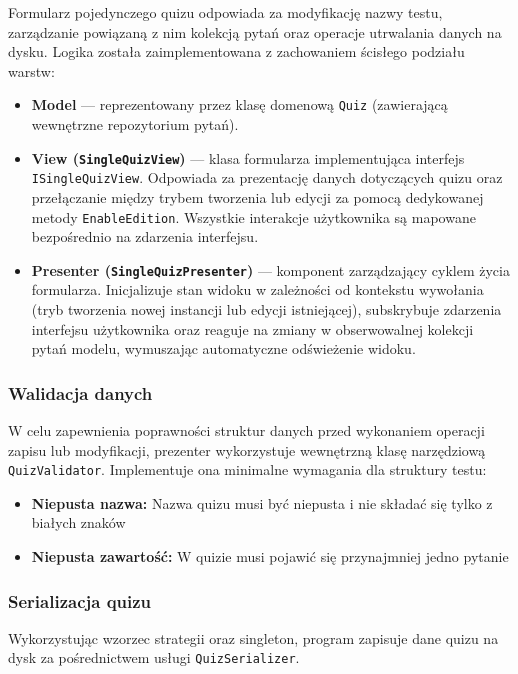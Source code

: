 \documentclass[12pt,a4paper]{article}
\begin{document}
Formularz pojedynczego quizu odpowiada za modyfikację nazwy testu, zarządzanie powiązaną z nim kolekcją pytań oraz operacje utrwalania danych na dysku. Logika została zaimplementowana z zachowaniem ścisłego podziału warstw:

\begin{itemize}
    \item \textbf{Model} --- reprezentowany przez klasę domenową \texttt{Quiz} (zawierającą wewnętrzne repozytorium pytań).
    \item \textbf{View (\texttt{SingleQuizView})} --- klasa formularza implementująca interfejs \texttt{ISingleQuizView}. Odpowiada za prezentację danych dotyczących quizu oraz przełączanie między trybem tworzenia lub edycji za pomocą dedykowanej metody \texttt{EnableEdition}. Wszystkie interakcje użytkownika są mapowane bezpośrednio na zdarzenia interfejsu.
    \item \textbf{Presenter (\texttt{SingleQuizPresenter})} --- komponent zarządzający cyklem życia formularza. Inicjalizuje stan widoku w zależności od kontekstu wywołania (tryb tworzenia nowej instancji lub edycji istniejącej), subskrybuje zdarzenia interfejsu użytkownika oraz reaguje na zmiany w obserwowalnej kolekcji pytań modelu, wymuszając automatyczne odświeżenie widoku.
\end{itemize}

\subsubsection{Walidacja danych}

W celu zapewnienia poprawności struktur danych przed wykonaniem operacji zapisu lub modyfikacji, prezenter wykorzystuje wewnętrzną klasę narzędziową \texttt{QuizValidator}. Implementuje ona minimalne wymagania dla struktury testu:

\begin{itemize}
    \item \textbf{Niepusta nazwa:} Nazwa quizu musi być niepusta i nie składać się tylko z białych znaków
    \item \textbf{Niepusta zawartość:} W quizie musi pojawić się przynajmniej jedno pytanie
\end{itemize}

\subsubsection{Serializacja quizu}

Wykorzystując wzorzec strategii oraz singleton, program zapisuje dane quizu na dysk za pośrednictwem usługi \verb|QuizSerializer|.
\end{document}
